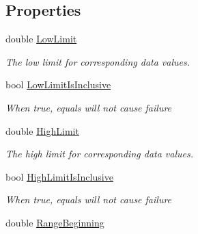 \subsection*{Properties}
\begin{DoxyCompactItemize}
\item 
double \mbox{\hyperlink{class_c_s_i_1_1_library_1_1_array_utilities_1_1_array_limit_checks_1_1_range_limits_a69f32bae6a4e674959ee163f63afc82e}{Low\+Limit}}
\begin{DoxyCompactList}\small\item\em The low limit for corresponding data values. \end{DoxyCompactList}\item 
bool \mbox{\hyperlink{class_c_s_i_1_1_library_1_1_array_utilities_1_1_array_limit_checks_1_1_range_limits_aece1870312f41296da6f4d6060fb4927}{Low\+Limit\+Is\+Inclusive}}
\begin{DoxyCompactList}\small\item\em When true, equals will not cause failure \end{DoxyCompactList}\item 
double \mbox{\hyperlink{class_c_s_i_1_1_library_1_1_array_utilities_1_1_array_limit_checks_1_1_range_limits_ac1f959db7a220d191da9d7407ec42f31}{High\+Limit}}
\begin{DoxyCompactList}\small\item\em The high limit for corresponding data values. \end{DoxyCompactList}\item 
bool \mbox{\hyperlink{class_c_s_i_1_1_library_1_1_array_utilities_1_1_array_limit_checks_1_1_range_limits_a9159c53217ffbc56f0d21c09fce8694b}{High\+Limit\+Is\+Inclusive}}
\begin{DoxyCompactList}\small\item\em When true, equals will not cause failure \end{DoxyCompactList}\item 
double \mbox{\hyperlink{class_c_s_i_1_1_library_1_1_array_utilities_1_1_array_limit_checks_1_1_range_limits_a20b66cb27d8a1012dd04dc61c3e7745e}{Range\+Beginning}}

\end{DoxyCompactItemize}
